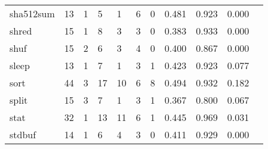 \begin{longtable}{lp{1.10cm}p{1.10cm}p{1.10cm}p{1.10cm}p{1.10cm}p{1.10cm}p{1.10cm}p{1.10cm}p{1.10cm}p{1.10cm}}
sha512sum &                     13 &                                  1 &                                 5 &                                1 &                                 6 &                               0 &                          0.481 &                                 0.923 &                               0.000 \\
shred     &                     15 &                                  1 &                                 8 &                                3 &                                 3 &                               0 &                          0.383 &                                 0.933 &                               0.000 \\
shuf      &                     15 &                                  2 &                                 6 &                                3 &                                 4 &                               0 &                          0.400 &                                 0.867 &                               0.000 \\
sleep     &                     13 &                                  1 &                                 7 &                                1 &                                 3 &                               1 &                          0.423 &                                 0.923 &                               0.077 \\
sort      &                     44 &                                  3 &                                17 &                               10 &                                 6 &                               8 &                          0.494 &                                 0.932 &                               0.182 \\
split     &                     15 &                                  3 &                                 7 &                                1 &                                 3 &                               1 &                          0.367 &                                 0.800 &                               0.067 \\
stat      &                     32 &                                  1 &                                13 &                               11 &                                 6 &                               1 &                          0.445 &                                 0.969 &                               0.031 \\
stdbuf    &                     14 &                                  1 &                                 6 &                                4 &                                 3 &                               0 &                          0.411 &                                 0.929 &                               0.000 \\

\end{longtable}
